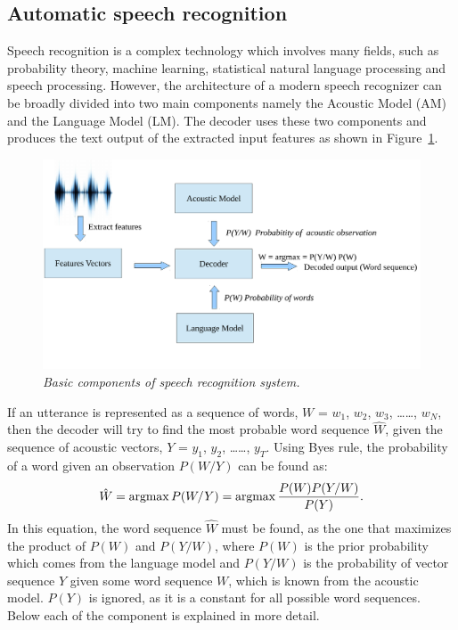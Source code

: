 \documentclass[a4paper, 12pt]{article}
\newcommand{\argmax}{\operatornamewithlimits{argmax}}
\begin{document}
\subsection{Automatic speech recognition}
Speech recognition is a complex technology which involves many fields, such as probability theory, machine learning, statistical natural language processing and speech processing. However, the architecture of a modern speech recognizer can be broadly divided into two main components namely the Acoustic Model (AM) and the Language Model (LM). The decoder uses these two components and produces the text output of the extracted input features as shown in Figure~\ref{fig:asr_component1}.
\begin{figure}[ht]
\centering
\includegraphics[width=\textwidth]{ASR_Component1.pdf}
\vspace{-1.2cm}
\caption{\textit{Basic components of speech recognition system.}}
\label{fig:asr_component1}
\end{figure}


If an utterance is represented as a sequence of words, $W$ = $w_1$, $w_2$, $w_3$, \dots \dots, $w_N$, then the decoder will try to find the most probable word sequence $\hat{W}$, given the sequence of acoustic vectors, $Y$ = $y_1$, $y_2$, \dots \dots, $y_T$. Using Byes rule, the probability of a word given an observation $P(W/Y)$ can be found as:
\begin{equation}
\label{equ:bayes_rule}
\hat{W} = \argmax P(W/Y) = \argmax\frac{P(W)P(Y/W)}{P(Y)}.
\end{equation}
In this equation, the word sequence $\hat{W}$ must be found, as the one that maximizes the product of $P(W)$ and $P(Y/W)$, where $P(W)$ is the prior probability which comes from the language model and $P(Y/W)$ is the probability of vector sequence $Y$ given some word sequence $W$, which is known from the acoustic model. $P(Y)$ is ignored, as it is a constant for all possible word sequences. Below each of the component is explained in more detail.
\end{document}

